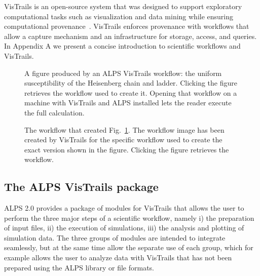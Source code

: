\documentclass[12pt]{iopart}
\begin{document}
VisTrails is an open-source system that was designed to support
exploratory computational tasks such as visualization and data mining
while ensuring computational provenance~\cite{vistrails,Bavoil05}.
VisTrails enforces provenance with workflows that allow a capture
mechanism and an infrastructure for storage, access, and queries. In Appendix A we present a concise introduction to scientific workflows and VisTrails.

\begin{figure}
\begin{center}

\caption{A figure produced by an ALPS VisTrails workflow: the uniform susceptibility of the Heisenberg chain and ladder. Clicking the figure retrieves the workflow used to 
create it. Opening that workflow on a machine with VisTrails and ALPS installed lets the reader execute the full calculation.}
\label{fig:figure}
\end{center}
\end{figure}


\begin{figure}
\begin{center}
\caption{The workflow that created Fig.~\ref{fig:figure}. The workflow image has been created by VisTrails for the specific workflow used to create the exact version shown in the figure. Clicking the figure retrieves the workflow.}
\label{fig:workflow}
\end{center}
\end{figure}



\subsection{The ALPS VisTrails package}

ALPS 2.0 provides a package of modules for VisTrails that allows the user to perform the three major steps of a scientific workflow, namely i) the preparation of input files, ii) the execution of simulations, iii) the analysis and plotting of simulation data. The three groups of modules are intended to integrate seamlessly, but at the same time allow the separate use of each group, which for example allows the user to analyze data with VisTrails that has not been prepared using the ALPS library or file formats.
\end{document}
